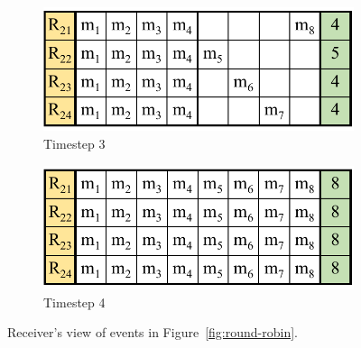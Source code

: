 \begin{figure}[t]
\begin{subfigure}[b]{0.32\columnwidth}
         \centering
         \includegraphics[width=\textwidth]{cack4.pdf}
         \caption{Timestep 3}
         \label{sfig:second-set}
     \end{subfigure}
     \begin{subfigure}[b]{0.32\columnwidth}
         \centering
         \includegraphics[width=\textwidth]{cack5.pdf}
         \caption{Timestep 4}
         \label{sfig:second-broadcast}
     \end{subfigure}
    \caption{Receiver's view of events in Figure~\ref{fig:round-robin}.}
    \label{fig:ack-counter}
\end{figure}

